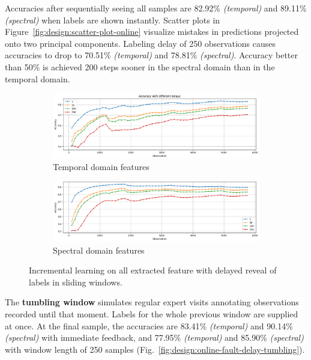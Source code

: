 Accuracies after sequentially seeing all samples are 82.92\% \emph{(temporal)} and 89.11\% \emph{(spectral)} when labels are shown instantly. Scatter plots in Figure~\ref{fig:design:scatter-plot-online} visualize mistakes in predictions projected onto two principal components. Labeling delay of 250 observations causes accuracies to drop to 70.51\% \emph{(temporal)} and 78.81\% \emph{(spectral)}. Accuracy better than 50\% is achieved 200 steps sooner in the spectral domain than in the temporal domain.
	
\begin{figure}[ht]
    \centering
    \begin{subfigure}[b]{0.49\textwidth}
        \includegraphics[width=\textwidth]{assets/design/gradual-learning-accuracy-delay-temporal-domain-fault.png}
        \caption{Temporal domain features}
    \end{subfigure}
    \hfill
    \begin{subfigure}[b]{0.49\textwidth}
        \includegraphics[width=\textwidth]{assets/design/gradual-learning-accuracy-delay-spectral-domain-fault.png}
        \caption{Spectral domain features}
    \end{subfigure}
    \caption{Incremental learning on all extracted feature with delayed reveal of labels in sliding windows.}
    \label{fig:design:online-fault-delay-sliding}
\end{figure}
	
	
The \textbf{tumbling window} simulates regular expert visits annotating observations recorded until that moment. Labels for the whole previous window are supplied at once. At the final sample, the accuracies are 83.41\% \emph{(temporal)} and 90.14\% \emph{(spectral)} with immediate feedback, and 77.95\% \emph{(temporal)} and 85.90\% \emph{(spectral)} with window length of 250 samples (Fig.~\ref{fig:design:online-fault-delay-tumbling}). 

